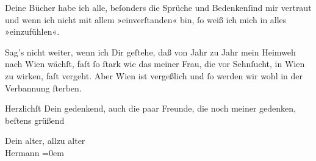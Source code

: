 \pstart
           Deine Bücher habe ich alle, beſonders die Sprüche und
                  Bedenkenſind mir vertraut und wenn ich nicht mit {\pb}allem »einverſtanden« bin, ſo weiß ich mich in
               alles »einzufühlen«.\pend
           
\pstart
           Sag’s nicht weiter, wenn ich Dir geſtehe, daß von Jahr zu Jahr mein Heimweh nach Wien wächſt, faſt ſo ſtark wie das meiner Frau, die vor Sehnſucht, in
                  Wien zu wirken, faſt vergeht. Aber Wien ist vergeßlich und ſo werden wir wohl in der
               Verbannung ſterben.\pend
           
\pstart
           Herzlichſt Dein gedenkend, auch die paar Freunde, die noch meiner gedenken, beſtens
               grüßend\pend
           
\pstart
           Dein alter, allzu alter{\\[\baselineskip]}\spacefill\mbox{Hermann}\pend
           \leftskip=0em{}\endnumbering{}  
      